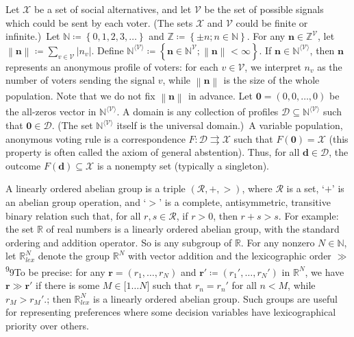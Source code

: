 \documentclass[
]{article}
\begin{document}
Let \(\mathcal{X}\) be a set of social alternatives, and let
\(\mathcal{V}\) be the set of possible signals which could be sent by
each voter. (The sets \(\mathcal{X}\) and \(\mathcal{V}\) could be
finite or infinite.)~Let
\(\mathbb{N} ≔ \left\{ 0,1,2,3,\ldots \right\}\) and
\(\mathbb{Z} ≔ \left\{ \pm n;n \in \mathbb{N} \right\}\). For any
\(\mathbf{n} \in \mathbb{Z}^{\mathcal{V}}\), let
\(\left\| \mathbf{n} \right\|_{} ≔ \sum_{v \in \mathcal{V}}\left| n_{v} \right|\).
Define
\(\mathbb{N}^{\langle\mathcal{V}\rangle} ≔ \left\{ \mathbf{n} \in \mathbb{N}^{\mathcal{V}};\left\| \mathbf{n} \right\|_{} < \infty \right\}\).
If \(\mathbf{n} \in \mathbb{N}^{\langle\mathcal{V}\rangle}\), then
\(\mathbf{n}\) represents an anonymous profile of voters: for each
\(v \in \mathcal{V}\), we interpret \(n_{v}\) as the number of voters
sending the signal \(v\), while \(\left\| \mathbf{n} \right\|_{}\) is
the size of the whole population. Note that we do not fix
\(\left\| \mathbf{n} \right\|_{}\) in advance. Let
\(\mathbf{0} = (0,0,\ldots,0)\) be the all-zeros vector in
\(\mathbb{N}^{\langle\mathcal{V}\rangle}\). A domain is any collection
of profiles
\(\mathcal{D} \subseteq \mathbb{N}^{\langle\mathcal{V}\rangle}\) such
that \(\mathbf{0} \in \mathcal{D}\). (The set
\(\mathbb{N}^{\langle\mathcal{V}\rangle}\) itself is the universal
domain.)~A variable population, anonymous voting rule is a
correspondence
\(\left. F:\mathcal{D}\rightrightarrows\mathcal{X} \right.\) such that
\(F\left( \mathbf{0} \right) = \mathcal{X}\) (this property is often
called the axiom of general abstention). Thus, for all
\(\mathbf{d} \in \mathcal{D}\), the outcome
\(F\left( \mathbf{d} \right) \subseteq \mathcal{X}\) is a nonempty set
(typically a singleton).

A linearly ordered abelian group is a triple
\(\left( \mathcal{R}, + , > \right)\), where \(\mathcal{R}\) is a set,
`\(+\)' is an abelian group operation, and `\(>\)' is a complete,
antisymmetric, transitive binary relation such that, for all
\(r,s \in \mathcal{R}\), if \(r > 0\), then \(r + s > s\). For example:
the set \(\mathbb{R}\) of real numbers is a linearly ordered abelian
group, with the standard ordering and addition operator. So is any
subgroup of \(\mathbb{R}\). For any nonzero \(N \in \mathbb{N}\), let
\(\mathbb{R}_{lex}^{N}\) denote the group \(\mathbb{R}^{N}\) with vector
addition and the lexicographic order \(\gg\)\textsuperscript{9}9To be
precise: for any \(\mathbf{r} = \left( r_{1},\ldots,r_{N} \right)\) and
\(\mathbf{r}' ≔ \left( r_{1}',\ldots,r_{N}' \right)\) in
\(\mathbb{R}^{N}\), we have \(\mathbf{r} \gg \mathbf{r}'\) if there is
some \(M \in \lbrack 1\ldots N\rbrack\) such that \(r_{n} = r_{n}'\) for
all \(n < M\), while \(r_{M} > r_{M}'\).; then \(\mathbb{R}_{lex}^{N}\)
is a linearly ordered abelian group. Such groups are useful for
representing preferences where some decision variables have
lexicographical priority over others.
\end{document}
